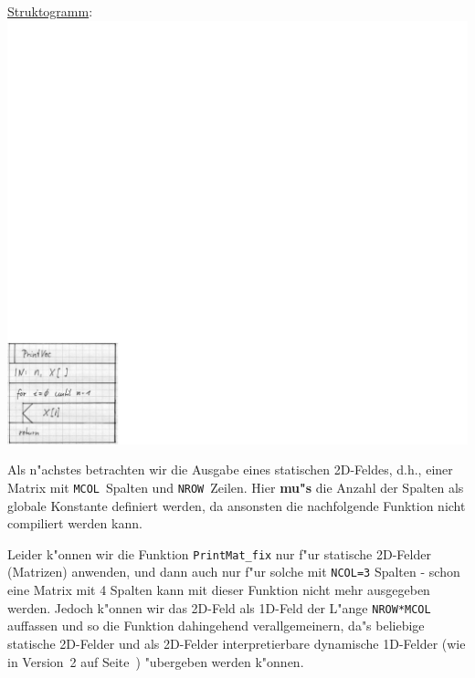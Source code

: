\underline{Struktogramm}: \\
\includegraphics[scale=0.7]{GIF/p71}
%
%

Als n"achstes betrachten wir die Ausgabe eines statischen 2D-Feldes,
d.h., einer Matrix mit \verb|MCOL|~Spalten und \verb|NROW|~Zeilen.
Hier \textbf{mu"s} die Anzahl der Spalten als globale Konstante definiert
werden, da ansonsten die nachfolgende Funktion nicht compiliert werden kann.
%
%

Leider k"onnen wir die Funktion \verb|PrintMat_fix| nur f"ur
statische 2D-Felder (Matrizen) anwenden, und dann auch nur f"ur
solche mit \verb|NCOL=3| Spalten - schon eine Matrix mit 4 Spalten 
kann mit dieser Funktion nicht mehr ausgegeben
werden.
Jedoch k"onnen wir das 2D-Feld als 1D-Feld der L"ange \verb|NROW*MCOL|
auffassen und so die Funktion dahingehend verallgemeinern, da"s
beliebige statische 2D-Felder und als 2D-Felder interpretierbare
dynamische 1D-Felder
(wie in Version~2 auf Seite~\pageref{page:2DarrayVariant2})
"ubergeben werden k"onnen. 
%
%

